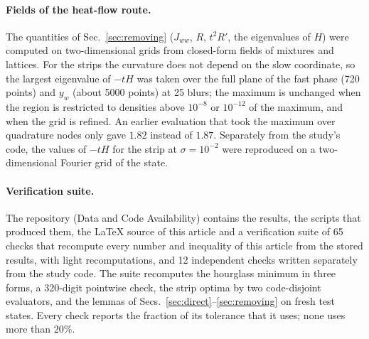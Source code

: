 \paragraph*{Fields of the heat-flow route.} The quantities of Sec.~\ref{sec:removing} ($J_{ww}$, $R$, $t^2R'$, the eigenvalues of $H$) were computed on two-dimensional grids from closed-form fields of mixtures and lattices. For the strips the curvature does not depend on the slow coordinate, so the largest eigenvalue of $-tH$ was taken over the full plane of the fast phase (720 points) and $y_w$ (about 5000 points) at 25 blurs; the maximum is unchanged when the region is restricted to densities above $10^{-8}$ or $10^{-12}$ of the maximum, and when the grid is refined. An earlier evaluation that took the maximum over quadrature nodes only gave $1.82$ instead of $1.87$. Separately from the study's code, the values of $-tH$ for the strip at $\sigma = 10^{-2}$ were reproduced on a two-dimensional Fourier grid of the state.

\paragraph*{Verification suite.} The repository (Data and Code Availability) contains the results, the scripts that produced them, the LaTeX source of this article and a verification suite of 65 checks that recompute every number and inequality of this article from the stored results, with light recomputations, and 12 independent checks written separately from the study code. The suite recomputes the hourglass minimum in three forms, a 320-digit pointwise check, the strip optima by two code-disjoint evaluators, and the lemmas of Secs.~\ref{sec:direct}--\ref{sec:removing} on fresh test states. Every check reports the fraction of its tolerance that it uses; none uses more than $20\%$.
